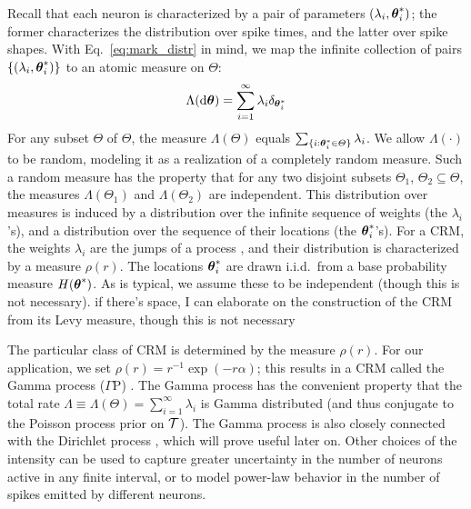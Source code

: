 Recall that each neuron is characterized by a pair of parameters $(\lambda_i, \boldsymbol{\theta}^*_i)$; the former characterizes the distribution over spike times, 
and the latter over spike
shapes. With Eq.~\eqref{eq:mark_distr} in mind, we map the infinite collection of pairs $\{(\lambda_i, \boldsymbol{\theta}^*_i)\}$ to an atomic measure on $\Theta$:
\begin{align}
  \Lambda(\mathrm{d} \boldsymbol{\theta}) = \sum_{i=1}^{\infty} \lambda_i \delta_{\boldsymbol{\theta}^*_i}
\end{align}
For any subset $\varTheta$ of $\Theta$, the measure $\Lambda(\varTheta)$ equals \( \sum_{\{ i: \boldsymbol{\theta}^*_i \in \varTheta \} } \lambda_i\). We allow $\Lambda(\cdot)$ to be random,
modeling it as a realization of a completely random measure. Such a random measure has the property that for any two disjoint subsets $\varTheta_1$,  $\varTheta_2 \subseteq \Theta$, the measures $\Lambda(\varTheta_1)$ and $\Lambda(\varTheta_2)$ are independent. 
This distribution over measures is induced by a distribution
over the infinite sequence of weights (the $\lambda_i$'s), and a distribution over the sequence of their locations (the $\boldsymbol{\theta}^*_i$'s). 
For a CRM, the weights $\lambda_i$ are the jumps of a \Levy process \citep{Sato90}, and their distribution is characterized by a 
\Levy measure $\rho(r)$. The locations $\boldsymbol{\theta}^*_i$ are drawn i.i.d.\  from a base probability measure $H(\boldsymbol{\theta}^*)$.
As is typical, we assume these to be independent (though this is not necessary). {\color{red} if there's space, I
can elaborate on the construction of the CRM from its Levy measure, though this is not necessary}

The particular class of CRM is determined by the \Levy measure $\rho(r)$. For our application, we set $\rho(r) = r^{-1}\exp(-r\alpha)$;
this results in a CRM called the Gamma process ($\Gamma$P) \citep{applebaum2004}. 
The Gamma process has the convenient property that the 
total rate $\Lambda \equiv \Lambda(\Theta) = \sum_{i=1}^{\infty} \lambda_i$ is Gamma distributed (and thus conjugate to the Poisson process prior on $\mathcal{T}$).
The Gamma process is also closely connected with the Dirichlet process \citep{Ferguson73}, which will prove useful
later on.
Other choices of the \Levy intensity can be used to capture greater uncertainty in the number of neurons active in any finite interval, or to model
power-law behavior in the number of spikes emitted by different neurons.


